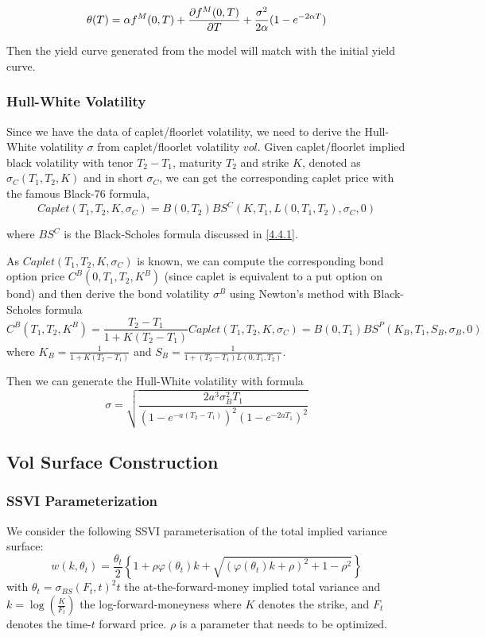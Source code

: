 \documentclass[11pt]{article}
\numberwithin{equation}{section}
\theoremstyle{remark}
\begin{document}
$$ \theta(T) = \alpha f^M(0,T) + \pdv{f^M(0, T)}{T} + \frac{\sigma^2}{2\alpha}(1-e^{- 2\alpha T}) $$

Then the yield curve generated from the model will match with the initial yield curve.

\subsubsection{Hull-White Volatility}\label{3.3.3}
Since we have the data of caplet/floorlet volatility, we need to derive the Hull-White volatility $\sigma$ from caplet/floorlet volatility $vol$. Given caplet/floorlet implied black volatility with tenor $T_2-T_1$, maturity $T_2$ and strike $K$, denoted as $\sigma_C(T_1, T_2, K)$ and in short $\sigma_C$, we can get the corresponding caplet price with the famous Black-76 formula,
$$Caplet(T_1, T_2, K, \sigma_C) = B(0,T_2) BS^C(K, T_1, L(0, T_1, T_2), \sigma_C, 0)$$

where $BS^C$ is the Black-Scholes formula discussed in \ref{4.4.1}.

As $Caplet(T_1, T_2, K, \sigma_C)$ is known, we can compute the corresponding bond option price $C^B(0,T_1,T_2,K^B)$ (since caplet is equivalent to a put option on bond) and then derive the bond volatility $\sigma^B$ using Newton's method with Black-Scholes formula
$$C^B(T_1,T_2,K^B) = \frac{T_2-T_1}{1+K(T_2-T_1)}Caplet(T_1,T_2,K,\sigma_C) = B(0, T_1)BS^P(K_B,T_1,S_B,\sigma_B,0)$$
where $K_B=\frac{1}{1+K(T_2-T_1)}$ and $S_B=\frac{1}{1+(T_2-T_1)L(0,T_1,T_2)}$.

Then we can generate the Hull-White volatility with formula
$$ \sigma = \sqrt{\frac{2a^3\sigma_B^2T_1}{(1-e^{-a(T_2-T_1)})^2(1-e^{-2aT_1})^2}} $$

\subsection{Vol Surface Construction}\label{3.4}
\subsubsection{SSVI Parameterization}\label{3.4.1}
We consider the following SSVI parameterisation of the total implied variance surface:
$$
w(k,\theta_t)
= \frac{\theta_t}{2}\left\{1+\rho\varphi(\theta_t) k + \sqrt{\left(\varphi(\theta_t){k}+\rho\right)^2
+1-\rho^2 }\right\}
$$
with $\theta_t = \sigma_{BS}(F_t, t)^2 t$ the at-the-forward-money implied total variance and $k=\log \left( \frac{K}{F_t} \right)$ the log-forward-moneyness where $K$ denotes the strike, and $F_t$ denotes the time-$t$ forward price. $\rho$ is a parameter that needs to be optimized.
\end{document}
